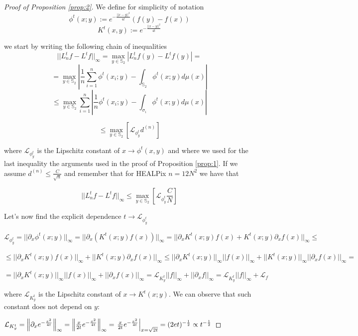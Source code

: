 \begin{proof}[Proof of Proposition \ref{prop:2}]
	
	We define for simplicity of notation
	$$\phi^t(x;y) := e^{-\frac{||x-y||^2}{4t}}\left(f(y)-f(x)\right)$$
	$$K^t(x,y) :=  e^{-\frac{||x-y||^2}{4t}}$$

	
	we start by writing the following chain of inequalities
	$$||L_n^tf-L^tf||_\infty = \max _{y\in \mathbb S_2} \left|L_n^tf(y)-L^tf(y)\right|=$$
	$$= \max _{y\in \mathbb S_2} \left| \frac{1}{n} \sum_{i=1}^n \phi^t(x_i; y)- \int_{\mathbb S_2} \phi^t(x;y)d\mu(x) \right|$$
	$$\leq \max _{y\in \mathbb S_2}  \sum_{i=1}^n   \left| \frac{1}{n}  \phi^t(x_i; y)- \int_{\sigma_i} \phi^t(x;y)d\mu(x) \right|$$

	$$\leq  \max _{y\in \mathbb S_2} \left[\mathcal L_{\phi^t_y}d^{(n)} \right]$$
	
	where $\mathcal L_{\phi^t_y}$ is the Lipschitz constant of $x \rightarrow \phi^t(x, y)$ and where we used for the last inequality the arguments used in the proof of Proposition \ref{prop:1}. If we assume $d^{(n)}\leq \frac{C}{\sqrt{n}}$ and remember that for HEALPix $n=12N^2$ we have that
	
	$$||L_n^tf-L^tf||_\infty  \leq  \max _{y\in \mathbb S_2} \left[ \mathcal L_{\phi^t_y} \frac{C}{N} \right]$$
	
	Let's now find the explicit dependence $t\rightarrow \mathcal L_{\phi^t_y}$
	
	$\mathcal L_{\phi^t_y} = ||\partial_x\phi^t(x;y)||_\infty = ||\partial_x\left(K^t(x;y)f(x)\right)||_\infty = ||\partial_x K^t(x;y)f(x) + K^t(x;y)\partial_x f(x)||_\infty \leq$
	
	$ \leq ||\partial_x K^t(x;y)f(x)||_\infty + ||K^t(x;y)\partial_x f(x)||_\infty \leq  ||\partial_x K^t(x;y)||_\infty||f(x)||_\infty + ||K^t(x;y)||_\infty||\partial_x f(x)||_\infty = $
	
	$ = ||\partial_x K^t(x;y)||_\infty||f(x)||_\infty + ||\partial_x f(x)||_\infty = \mathcal L_{K^t_y} ||f||_\infty + ||\partial_xf||_\infty = \mathcal L_{K^t_y} ||f||_\infty + \mathcal L_f$
	
	where $\mathcal L_{K^t_y}$ is the Lipschitz constant of $x\rightarrow K^t(x;y)$. We can observe that such constant does not depend on $y$:
	
	$\mathcal L_{K^t_y} = \left\lVert\partial_x e^{-\frac{x^2}{4t}}\right\rVert_\infty = \left\lVert\frac{x}{2t}e^{-\frac{x^2}{4t}}\right\rVert_\infty = \left. \frac{x}{2t}e^{-\frac{x^2}{4t}}\right|_{x=\sqrt{2t}}=(2et)^{-\frac{1}{2}}\propto t ^ {-\frac{1}{2}}$
	

\end{proof}
